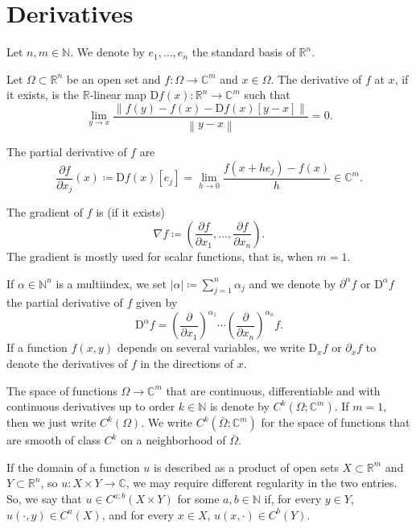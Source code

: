 \documentclass[a4paper,9pt]{amsart}
\newcommand{\N}{\mathbb{N}}	%
\newcommand{\R}{\mathbb{R}}	%
\newcommand{\C}{\mathbb{C}}	%
\newcommand{\de}{\partial}		%
\newcommand{\Diff}{\mathrm{D}}
\newcommand{\grad}{\nabla}
\newcommand{\abs}[1]{\left\lvert #1 \right\rvert}
\newcommand{\norm}[1]{\left\lVert #1 \right\rVert}
\theoremstyle{plain}
\theoremstyle{definition}
\theoremstyle{remark}
\begin{document}
\section{Derivatives}\label{sec6889e87f}

Let $n,m\in\N$.
We denote by $e_1,\dots,e_n$ the standard basis of $\R^n$.

Let $\Omega\subset\R^n$ be an open set and $f:\Omega\to\C^m$ and $x\in\Omega$.
The derivative of $f$ at $x$, if it exists, is the $\R$-linear map $\Diff f(x):\R^n\to\C^m$ such that
\begin{equation}
	\lim_{y\to x} \frac{ \norm{ f(y) - f(x) - \Diff f(x)[y-x] } }{ \norm{y-x} } = 0 .
\end{equation}

The partial derivative of $f$ are
\begin{equation}
	\frac{\de f}{\de x_j}(x) 
	\coloneqq \Diff f(x)[e_j] 
	= \lim_{h\to0} \frac{ f(x+h e_j) - f(x) }{ h } \in \C^m .
\end{equation}

The gradient of $f$ is (if it exists)
\begin{equation}
	\grad f
	\coloneqq \left( \frac{\de f}{\de x_1} , \dots, \frac{\de f}{\de x_n} \right) .
\end{equation}
The gradient is mostly used for scalar functions, that is, when $m=1$.

If $\alpha\in\N^n$ is a multiindex, we set $\abs{\alpha} \coloneqq \sum_{j=1}^n\alpha_j$ and we denote by $\de^\alpha f$ or $\Diff^\alpha f$ the partial derivative of $f$ given by 
\begin{equation}
	\Diff^\alpha f = \left(\frac{\de }{\de x_1}\right)^{\alpha_1} \cdots \left(\frac{\de }{\de x_n} \right)^{\alpha_n} f .
\end{equation}
If a function $f(x,y)$ depends on several variables, we write $\Diff_xf$ or $\de_xf$ to denote the derivatives of $f$ in the directions of $x$.

The space of functions $\Omega\to\C^m$ that are continuous, differentiable and with continuous derivatives up to order $k\in\N$ is denote by $C^k(\Omega;\C^m)$.
If $m=1$, then we just write $C^k(\Omega)$.
We write $C^k(\bar\Omega;\C^m)$ for the space of functions that are smooth of class $C^k$ on a neighborhood of $\bar\Omega$.

If the domain of a function $u$ is described as a product of open sets $X\subset\R^m$ and $Y\subset\R^n$, 
so $u:X\times Y\to\C$, we may require different regularity in the two entries.
So, we say that $u\in C^{a;b}(X\times Y)$ for some $a,b\in\N$ if, for every $y\in Y$, $u(\cdot,y)\in C^a(X)$, and for every $x\in X$, $u(x,\cdot)\in C^b(Y)$.
\end{document}
